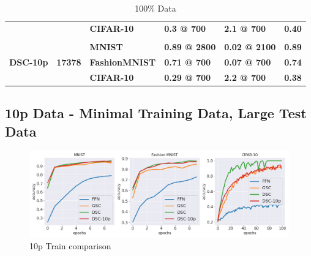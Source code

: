 \documentclass{article}
\begin{document}
\begin{table}[H]
\begin{tabular}{llllll}
\textbf{}                         & \textbf{}                       & \textbf{CIFAR-10}        & \textbf{0.3 @ 700}   & \textbf{2.1 @ 700}   & \textbf{0.40}            \\
                                  &                                 &                          &                      &                      &                          \\
\multirow{3}{*}{\textbf{DSC-10p}} & \multirow{3}{*}{\textbf{17378}} & \textbf{MNIST}           & \textbf{0.89 @ 2800} & \textbf{0.02 @ 2100} & \textbf{0.89}            \\
                                  &                                 & \textbf{FashionMNIST}    & \textbf{0.71 @ 700}  & \textbf{0.07 @ 700}  & \textbf{0.74}            \\
                                  &                                 & \textbf{CIFAR-10}        & \textbf{0.29 @ 700}  & \textbf{2.2 @ 700}   & \textbf{0.38}            \\ \cmidrule(l){3-6} 
\end{tabular}
\caption{100\% Data}
\label{tab:my-table}
\end{table}







\subsection{10p Data - Minimal Training Data, Large Test Data}
\begin{figure}[h!]
\centering
\includegraphics[scale=0.4]{paper/10p_runs.png}
\caption{10p Train comparison}
\label{fig:infotransfer}
\end{figure}
\end{document}
